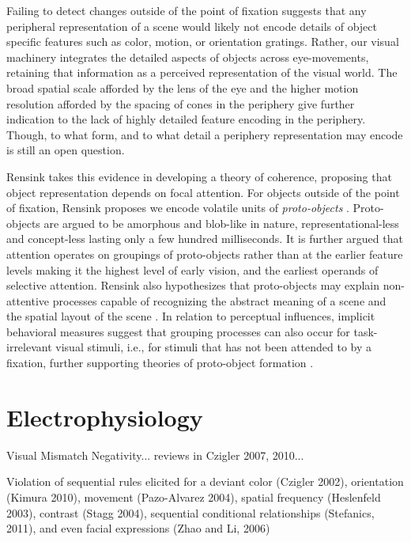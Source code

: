 \documentclass[a4paper,11pt,final]{ThesisStyle}
\begin{document}
Failing to detect changes outside of the point of fixation suggests that any peripheral representation of a scene would likely not encode details of object specific features such as color, motion, or orientation gratings.  Rather, our visual machinery integrates the detailed aspects of objects across eye-movements, retaining that information as a perceived representation of the visual world.  The broad spatial scale afforded by the lens of the eye and the higher motion resolution afforded by the spacing of cones in the periphery give further indication to the lack of highly detailed feature encoding in the periphery.  Though, to what form, and to what detail a periphery representation may encode is still an open question.  

Rensink takes this evidence in developing a theory of coherence, proposing that object representation depends on focal attention.  For objects outside of the point of fixation, Rensink proposes we encode volatile units of \textit{proto-objects} \cite{Rensink2000,Rensink2001}.  Proto-objects are argued to be amorphous and blob-like in nature, representational-less and concept-less lasting only a few hundred milliseconds.  It is further argued that attention operates on groupings of proto-objects rather than at the earlier feature levels making it the highest level of early vision, and the earliest operands of selective attention.  Rensink also hypothesizes that proto-objects may explain non-attentive processes capable of recognizing the abstract meaning of a scene and the spatial layout of the scene \cite{Rensink2002}.  In relation to perceptual influences, implicit behavioral measures suggest that grouping processes can also occur for task-irrelevant visual stimuli, i.e., for stimuli that has not been attended to by a fixation, further supporting theories of proto-object formation \cite{Lamy2006}.

\section{Electrophysiology}\label{sec:electrophysiology}

Visual Mismatch Negativity... reviews in Czigler 2007, 2010...
\cite{Stefanics2011}

Violation of sequential rules elicited for a deviant color (Czigler 2002), orientation (Kimura 2010), movement (Pazo-Alvarez 2004), spatial frequency (Heslenfeld 2003), contrast (Stagg 2004), sequential conditional relationships (Stefanics, 2011), and even facial expressions (Zhao and Li, 2006)
\end{document}
